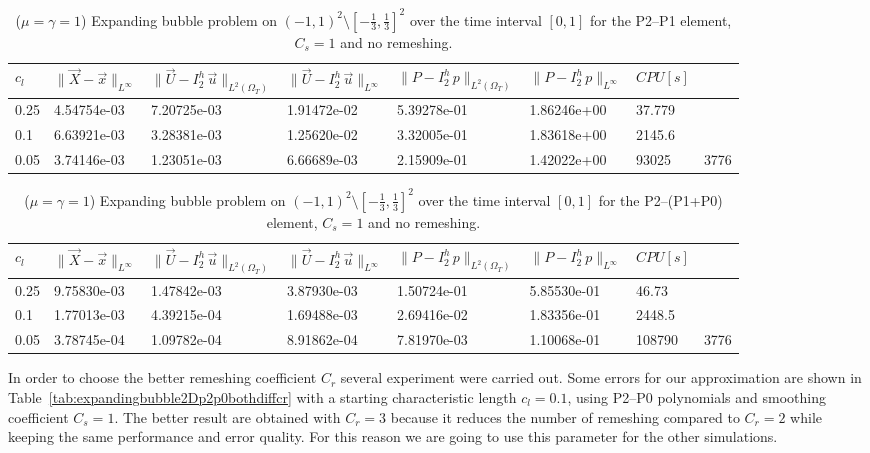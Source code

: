 \documentclass[a4paper,12pt,onecolumn]{article}
\newcommand{\errorXx}{\|\vec{X} - \vec{x}\|_{L^\infty}}
\newcommand{\LerrorUu}[1]{\|\vec U - I^h_{#1}\,\vec u\|_{L^2(\Omega_T)}}
\newcommand{\errorUu}[1]{\|\vec U - I^h_{#1}\,\vec u\|_{L^\infty}}
\newcommand{\errorPp}[1]{\|P - I^h_{#1}\,p\|_{L^\infty}}
\newcommand{\LerrorPp}[1]{\|P - I^h_{#1}\,p\|_{L^2(\Omega_T)}}
\begin{document}
\begin{table}
 \center
 \hspace*{-2cm}
\begin{tabular}{llllllll}
\hline
$c_l$ & $\errorXx$ & $\LerrorUu2$ & $\errorUu2$ & $\LerrorPp2$ & $\errorPp2$ & $CPU[s]$ \\
\hline
0.25 & 4.54754e-03 & 7.20725e-03 & 1.91472e-02 & 5.39278e-01 & 1.86246e+00 & 37.779\\
0.1 & 6.63921e-03 & 3.28381e-03 & 1.25620e-02 & 3.32005e-01 & 1.83618e+00 & 2145.6\\
0.05 & 3.74146e-03 & 1.23051e-03 & 6.66689e-03 & 2.15909e-01 & 1.42022e+00 & 93025 & 3776\\
\hline
\end{tabular}
\hspace*{-2cm}
\caption{($\mu=\gamma=1$) Expanding bubble problem on $(-1,1)^2\setminus[-\frac{1}{3},\frac{1}{3}]^2$ over the time interval $[0,1]$ for the P2--P1 element, $C_s=1$ and no remeshing.}
\label{tab:expandingbubble2Dp2p1smooth}
\end{table}

\begin{table}
 \center
 \hspace*{-2cm}
\begin{tabular}{llllllll}
\hline
$c_l$ & $\errorXx$ & $\LerrorUu2$ & $\errorUu2$ & $\LerrorPp2$ & $\errorPp2$ & $CPU[s]$\\
\hline
0.25 & 9.75830e-03 & 1.47842e-03 & 3.87930e-03 & 1.50724e-01 & 5.85530e-01 & 46.73\\
0.1 & 1.77013e-03 & 4.39215e-04 & 1.69488e-03 & 2.69416e-02 & 1.83356e-01 & 2448.5\\
0.05 & 3.78745e-04 & 1.09782e-04 & 8.91862e-04 & 7.81970e-03 & 1.10068e-01 & 108790 & 3776\\
\hline
\end{tabular}
\hspace*{-2cm}
\caption{($\mu=\gamma=1$) Expanding bubble problem on $(-1,1)^2\setminus[-\frac{1}{3},\frac{1}{3}]^2$ over the time interval $[0,1]$ for the P2--(P1+P0) element, $C_s=1$ and no remeshing.}
\label{tab:expandingbubble2Dp2p1p0smooth}
\end{table}

In order to choose the better remeshing coefficient $C_r$ several experiment were carried out. Some errors for our approximation are shown in Table~\ref{tab:expandingbubble2Dp2p0bothdiffcr} with a starting characteristic length $c_l=0.1$, using P2--P0 polynomials and smoothing coefficient $C_s=1$. The better result are obtained with $C_r=3$ because it reduces the number of remeshing compared to $C_r=2$ while keeping the same performance and error quality. For this reason we are going to use this parameter for the other simulations.
\end{document}
